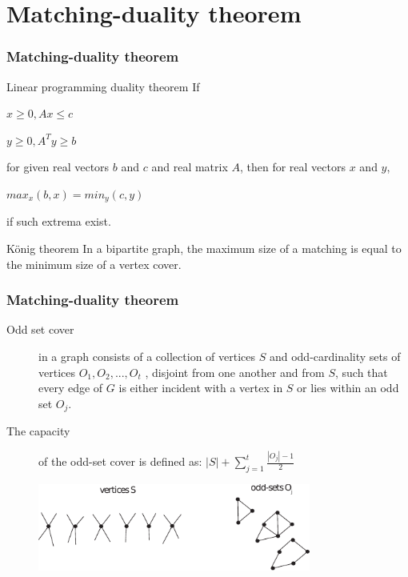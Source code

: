 \documentclass[hyperref={pdfpagelabels=false}]{beamer}
\begin{document}
\section{Matching-duality theorem}
\frame
{
	\frametitle{Matching-duality theorem}

	\begin{block}{Linear programming duality theorem}
		If
		
		\begin{center}
		$x \geq 0, Ax \leq c$ 
		
		$y \geq 0, A^{T}y \geq b$
		\end{center}
		
		for given real vectors $b$ and $c$ and real matrix $A$, then for real vectors $x$ and $y$,
		
		\begin{center}
		$max_{x}(b,x) = min_{y}(c, y)$
		\end{center}
		
		if such extrema exist.
	\end{block}
	
	\begin{block}{K\"{o}nig theorem}
		In a bipartite graph, the maximum size of a matching is equal to the minimum size of a vertex cover.
	\end{block}

}

\frame
{
	\frametitle{Matching-duality theorem}
	
	\begin{description}
	\item[Odd set cover] in a graph consists of a collection of vertices $S$ and odd-cardinality sets of vertices
$O_{1} , O_{2} , ..., O_{t}$ , disjoint from one another and from $S$, such that every edge of $G$ is either
incident with a vertex in $S$ or lies within an odd set $O_{j}$.
	\item[The capacity] of the odd-set cover is defined as: $|S| + \sum\limits_{j=1}^{t} \frac{|O_{j}| - 1}{2}$
	\end{description}
	
	\begin{figure}[htb]
	\centering
	\includegraphics[width=0.8\textwidth]{figures/oddset.pdf}
	\end{figure}
}
\end{document}
